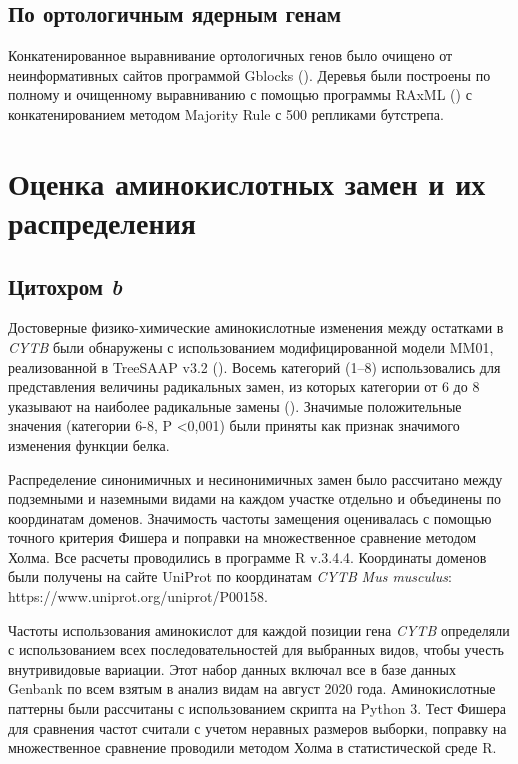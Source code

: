 \subsection{По ортологичным ядерным генам}

Конкатенированное выравнивание ортологичных генов было очищено от неинформативных сайтов программой Gblocks (\cite{Castresana2000}). Деревья были построены по полному и очищенному выравниванию с помощью программы RAxML (\cite{Stamatakis2014}) с конкатенированием методом Majority Rule с 500 репликами бутстрепа. 

\section{Оценка аминокислотных замен и их распределения}

\subsection{Цитохром \textit{b}}

Достоверные физико-химические аминокислотные изменения между остатками в \textit{CYTB} были обнаружены с использованием модифицированной модели MM01, реализованной в TreeSAAP v3.2 (\cite{Woolley2003}). Восемь категорий (1–8) использовались для представления величины радикальных замен, из которых категории от 6 до 8 указывают на наиболее радикальные замены (\cite{McClellan2001}). Значимые положительные значения (категории 6-8, P <0,001) были приняты как признак значимого изменения функции белка.

Распределение синонимичных и несинонимичных замен было рассчитано между подземными и наземными видами на каждом участке отдельно и объединены по координатам доменов. Значимость частоты замещения оценивалась с помощью точного критерия Фишера и поправки на множественное сравнение методом Холма. Все расчеты проводились в программе R v.3.4.4. Координаты доменов были получены на сайте UniProt по координатам \textit{CYTB} \textit{Mus musculus}: https://www.uniprot.org/uniprot/P00158.

Частоты использования аминокислот для каждой позиции гена \textit{CYTB} определяли с использованием всех последовательностей для выбранных видов, чтобы учесть внутривидовые вариации. Этот набор данных включал все в базе данных Genbank по всем взятым в анализ видам на август 2020 года. Аминокислотные паттерны были рассчитаны с использованием скрипта на Python 3. Тест Фишера для сравнения частот считали с учетом неравных размеров выборки, поправку на множественное сравнение проводили методом Холма в статистической среде R.

